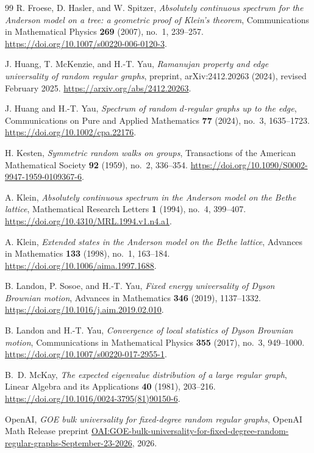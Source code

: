 \begin{thebibliography}{99}
R. Froese, D. Hasler, and W. Spitzer,
\emph{Absolutely continuous spectrum for the Anderson model on a tree: a geometric proof of Klein's theorem},
Communications in Mathematical Physics \textbf{269} (2007), no.~1, 239--257.
\url{https://doi.org/10.1007/s00220-006-0120-3}.

J. Huang, T. McKenzie, and H.-T. Yau,
\emph{Ramanujan property and edge universality of random regular graphs},
preprint, arXiv:2412.20263 (2024), revised February 2025.
\url{https://arxiv.org/abs/2412.20263}.

J. Huang and H.-T. Yau,
\emph{Spectrum of random $d$-regular graphs up to the edge},
Communications on Pure and Applied Mathematics \textbf{77} (2024), no.~3, 1635--1723.
\url{https://doi.org/10.1002/cpa.22176}.

H. Kesten,
\emph{Symmetric random walks on groups},
Transactions of the American Mathematical Society \textbf{92} (1959), no.~2, 336--354.
\url{https://doi.org/10.1090/S0002-9947-1959-0109367-6}.

A. Klein,
\emph{Absolutely continuous spectrum in the Anderson model on the Bethe lattice},
Mathematical Research Letters \textbf{1} (1994), no.~4, 399--407.
\url{https://doi.org/10.4310/MRL.1994.v1.n4.a1}.

A. Klein,
\emph{Extended states in the Anderson model on the Bethe lattice},
Advances in Mathematics \textbf{133} (1998), no.~1, 163--184.
\url{https://doi.org/10.1006/aima.1997.1688}.

B. Landon, P. Sosoe, and H.-T. Yau,
\emph{Fixed energy universality of Dyson Brownian motion},
Advances in Mathematics \textbf{346} (2019), 1137--1332.
\url{https://doi.org/10.1016/j.aim.2019.02.010}.

B. Landon and H.-T. Yau,
\emph{Convergence of local statistics of Dyson Brownian motion},
Communications in Mathematical Physics \textbf{355} (2017), no.~3, 949--1000.
\url{https://doi.org/10.1007/s00220-017-2955-1}.

B.~D. McKay,
\emph{The expected eigenvalue distribution of a large regular graph},
Linear Algebra and its Applications \textbf{40} (1981), 203--216.
\url{https://doi.org/10.1016/0024-3795(81)90150-6}.

OpenAI,
\emph{GOE bulk universality for fixed-degree random regular graphs},
OpenAI Math Release preprint
\href{https://github.com/openai/math/blob/main/preprints/GOE-bulk-universality-for-fixed-degree-random-regular-graphs-September-23-2026/paper.pdf}{OAI:GOE-bulk-universality-for-fixed-degree-random-regular-graphs-September-23-2026},
2026.


\end{thebibliography}
